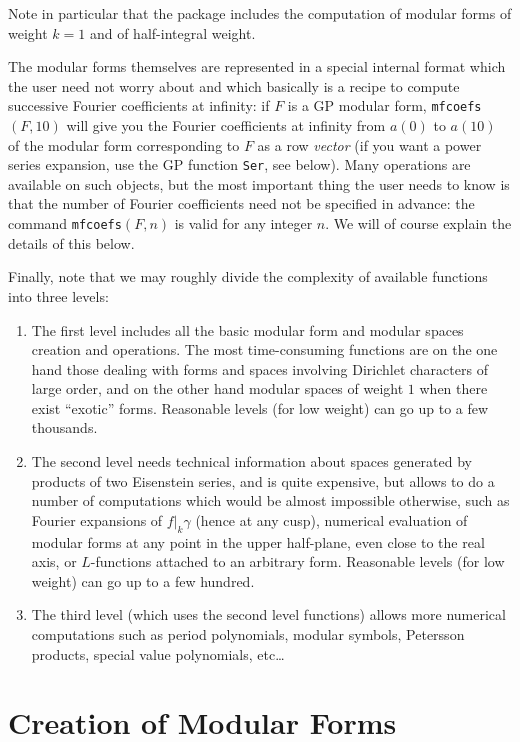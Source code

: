 \documentclass[11pt]{article}
\def\kbd#1{{\tt #1}}
\begin{document}
Note in particular that the package includes the computation of modular
forms of weight $k=1$ and of half-integral weight.

\medskip

The modular forms themselves are represented in a special internal format
which the user need not worry about and which basically is a recipe to
compute successive Fourier coefficients at infinity: if $F$ is a GP modular
form, \kbd{mfcoefs}$(F, 10)$ will give you the Fourier coefficients at infinity
from $a(0)$ to $a(10)$ of the modular form corresponding to $F$ as a row
\emph{vector} (if you want a power series expansion, use the GP function
\kbd{Ser}, see below). Many operations are available on such objects, but the
most important thing the user needs to know is that the number of Fourier
coefficients need not be specified in advance: the command
\kbd{mfcoefs}$(F,n)$ is valid for any integer $n$. We will of course explain
the details of this below.

\medskip

Finally, note that we may roughly divide the complexity of available functions
into three levels:

\begin{enumerate}
\item The first level includes all the basic modular form and modular spaces
creation and operations. The most time-consuming functions are on the one hand
those dealing with forms and spaces involving Dirichlet characters of large
order, and on the other hand modular spaces of weight $1$ when there exist
``exotic'' forms. Reasonable levels (for low weight) can go up to a few
thousands.
\item The second level needs technical information about spaces generated by
products of two Eisenstein series, and is quite expensive, but allows to do
a number of computations which would be almost impossible otherwise, such as
Fourier expansions of $f|_k\gamma$ (hence at any cusp), numerical
evaluation of modular forms at any point in the upper half-plane, even close
to the real axis, or $L$-functions attached to an arbitrary form.
Reasonable levels (for low weight) can go up to a few hundred.
\item The third level (which uses the second level functions) allows more
numerical computations such as period polynomials, modular symbols,
Petersson products, special value polynomials, etc\dots
\end{enumerate}

\section{Creation of Modular Forms}
\end{document}
